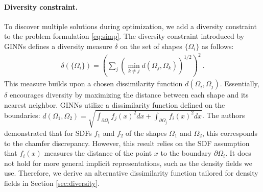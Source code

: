 \paragraph{Diversity constraint.}
To discover multiple solutions during optimization, we add a diversity constraint to the problem formulation \eqref{eq:simp}. The diversity constraint introduced by GINNs \citep{GINNs} defines a diversity measure $\delta$ on the set of shapes $\{ \Omega_i \}$ as follows:
\begin{align}
    \label{eq:div}
    \delta (\{ \Omega_i \}) = \left( \sum_j \left( \min_{k\neq j} d(\Omega_j, \Omega_k) \right)^{1/2} \right)^{2} \ .
\end{align}
This measure builds upon a chosen dissimilarity function $d(\Omega_i, \Omega_j)$.
Essentially, $\delta$ encourages diversity by maximizing the distance between each shape and its nearest neighbor.
GINNs utilize a dissimilarity function defined on the boundaries: $d(\Omega_1, \Omega_2) = \sqrt{\int_{\partial\Omega_i} f_j(x)^2 d{x} + \int_{\partial\Omega_j} f_i(x)^2 d{x}}$.
The authors demonstrated that for SDFs $f_1$ and $f_2$ of the shapes $\Omega_1$ and $\Omega_2$, this corresponds to the chamfer discrepancy. However, this result relies on the SDF assumption that $f_i(x)$ measures the distance of the point $x$ to the boundary $\partial \Omega_i$. It does not hold for more general implicit representations, such as the density fields we use. Therefore, we derive an alternative dissimilarity function tailored for density fields in Section \ref{sec:diversity}.


